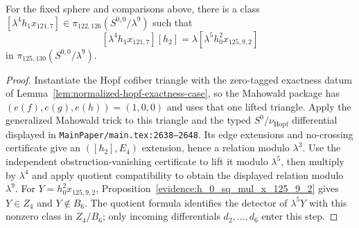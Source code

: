 \begin{lemma}
  \label{lem:near126-nu-extension}
  \notready
  For the fixed sphere and comparisons above, there is a class
  $[\lambda^4h_1x_{121,7}]\in
  \pi_{122,126}(S^{0,0}/\lambda^9)$ such that
  \[
    [\lambda^4h_1x_{121,7}][h_2]
       =\lambda[\lambda^5h_0^2x_{125,9,2}]
  \]
  in $\pi_{125,130}(S^{0,0}/\lambda^9)$.
\end{lemma}

\begin{proof}
  Instantiate the Hopf cofiber triangle with the zero-tagged exactness datum
  of Lemma~\ref{lem:normalized-hopf-exactness-case}, so the Mahowald package
  has $(e(f),e(g),e(h))=(1,0,0)$ and uses that one lifted triangle.  Apply the
  generalized Mahowald trick to this triangle and the
  typed $S^0/\nu_{\mathrm{Hopf}}$ differential
  displayed in \texttt{MainPaper/main.tex:2638--2648}.  Its edge extensions and
  no-crossing certificate give an $([h_2],E_4)$ extension, hence a relation
  modulo $\lambda^3$.  Use the independent obstruction-vanishing certificate
  to lift it modulo $\lambda^5$, then multiply by $\lambda^4$ and apply quotient
  compatibility to obtain the displayed relation modulo $\lambda^9$.
  For $Y=h_0^2x_{125,9,2}$, Proposition~\ref{evidence:h_0_sq_mul_x_125_9_2}
  gives $Y\in Z_4$ and $Y\notin B_6$. The quotient formula
  identifies the detector of $\lambda^5Y$ with this nonzero class in
  $Z_4/B_6$; only incoming differentials $d_2,\ldots,d_6$ enter this step.
\end{proof}

